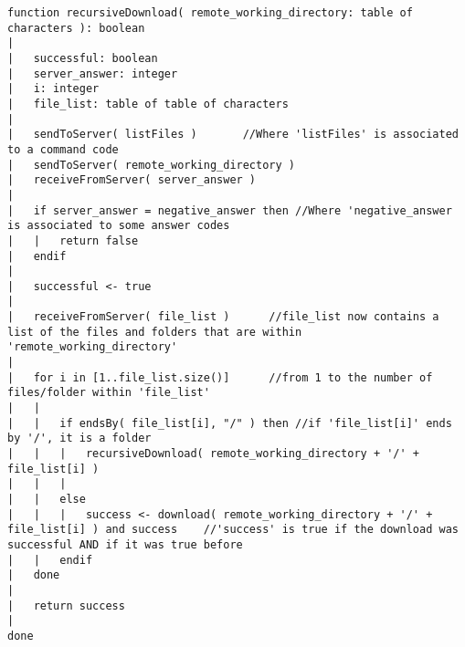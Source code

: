 \begin{lstlisting}
function recursiveDownload( remote_working_directory: table of characters ): boolean
|
|	successful: boolean
|	server_answer: integer
|	i: integer
|	file_list: table of table of characters
|
|	sendToServer( listFiles )		//Where 'listFiles' is associated to a command code
|	sendToServer( remote_working_directory )
|	receiveFromServer( server_answer )
|
|	if server_answer = negative_answer then	//Where 'negative_answer is associated to some answer codes
|	|	return false
|	endif
|
|	successful <- true	
|	
|	receiveFromServer( file_list )		//file_list now contains a list of the files and folders that are within 'remote_working_directory'
|
|	for i in [1..file_list.size()]		//from 1 to the number of files/folder within 'file_list'
|	|
|	|	if endsBy( file_list[i], "/" ) then	//if 'file_list[i]' ends by '/', it is a folder
|	|	|	recursiveDownload( remote_working_directory + '/' + file_list[i] )
|	|	|
|	|	else
|	|	|	success <- download( remote_working_directory + '/' + file_list[i] ) and success	//'success' is true if the download was successful AND if it was true before
|	|	endif
|	done
|
|	return success
|
done
\end{lstlisting}
